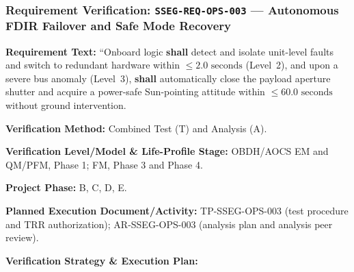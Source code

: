 \subsubsection{Requirement Verification: \texttt{SSEG-REQ-OPS-003} --- Autonomous FDIR Failover and Safe Mode Recovery}
\label{ver:SSEG-REQ-OPS-003}
\textbf{Requirement Text:} ``Onboard  logic \textbf{shall} detect and isolate unit-level faults and switch to redundant hardware within $\le 2.0\text{ seconds}$ (Level~2), and upon a severe bus anomaly (Level~3), \textbf{shall} automatically close the payload aperture shutter and acquire a power-safe Sun-pointing attitude within $\le 60.0\text{ seconds}$ without ground intervention.
\par\textbf{Verification Method:} Combined Test (T) and Analysis (A).
\par\textbf{Verification Level/Model \& Life-Profile Stage:} OBDH/AOCS EM and QM/PFM, Phase 1; FM, Phase 3 and Phase 4.
\par\textbf{Project Phase:} B, C, D, E.
\par\textbf{Planned Execution Document/Activity:} TP-SSEG-OPS-003 (test procedure and TRR authorization); AR-SSEG-OPS-003 (analysis plan and analysis peer review).
\par\textbf{Verification Strategy \& Execution Plan:}
